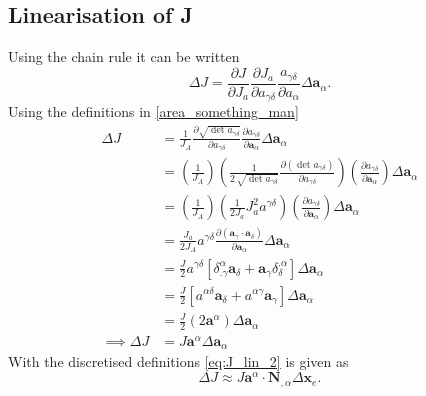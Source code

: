 \subsection{Linearisation of J}
Using the chain rule it can be written 
\begin{equation}\label{eq:J_lin_1}
    \Delta J = \frac{\partial J}{\partial J_{a}} \frac{\partial J_{a}}{\partial a_{\gamma \delta}} \frac{a_{\gamma \delta}}{\partial a_{\alpha}} \Delta \boldsymbol{a}_{\alpha}.
\end{equation}
Using the definitions in \eqref{area_something_man}
\begin{equation} \label{eq:J_lin_2}
    \begin{split}
        \Delta J &= \frac{1}{J_{A}} \frac{\partial \sqrt{\det a_{\gamma \delta}}}{\partial a_{\gamma \delta}} \frac{\partial a_{\gamma \delta}}{\partial \boldsymbol{a}_{\alpha}} \Delta \boldsymbol{a}_{\alpha} \\
        & = \left(\frac{1}{J_{A}}\right) \left(\frac{1}{2\,\sqrt{\det a_{\gamma \delta}}} \frac{\partial \left(\det a_{\gamma \delta}\right)}{\partial a_{\gamma \delta}}\right) \left(\frac{\partial a_{\gamma \delta}}{\partial \boldsymbol{a}_{\alpha}}\right) \Delta \boldsymbol{a}_{\alpha} \\
        & = \left(\frac{1}{J_{A}}\right) \left(\frac{1}{2 J_{a}} J_{a}^{2} a^{\gamma \delta}\right) \left(\frac{\partial a_{\gamma \delta}}{\partial \boldsymbol{a}_{\alpha}}\right) \Delta \boldsymbol{a}_{\alpha} \\
        & = \frac{J_{a}}{2 J_{A}} a^{\gamma \delta} \frac{\partial \left(\boldsymbol{a}_{\gamma} \cdot \boldsymbol{a}_{\delta}\right)}{\partial \boldsymbol{a}_{\alpha}} \Delta \boldsymbol{a}_{\alpha}\\
        & = \frac{J}{2} a^{\gamma \delta} \left[\delta^{\alpha}_{.\gamma} \boldsymbol{a}_{\delta} + \boldsymbol{a}_{\gamma} \delta_{\delta}^{.\alpha}\right] \Delta \boldsymbol{a}_{\alpha}\\
        & = \frac{J}{2} \left[a^{\alpha \delta} \boldsymbol{a}_{\delta} + a^{\alpha \gamma} \boldsymbol{a}_{\gamma}\right] \Delta \boldsymbol{a}_{\alpha}\\
        & = \frac{J}{2}\left(2 \boldsymbol{a}^{\alpha}\right) \Delta \boldsymbol{a}_{\alpha}\\
        \implies \Delta J & = J \boldsymbol{a}^{\alpha} \Delta \boldsymbol{a}_{\alpha}
    \end{split}
\end{equation}
With the discretised definitions \eqref{eq:J_lin_2} is given as
\begin{equation}\label{eq:J_lin_3}
    \Delta J \approx J \boldsymbol{a}^{\alpha} \cdot \mathbf{N}_{,\alpha} \Delta \mathbf{x}_{e}.
\end{equation}
